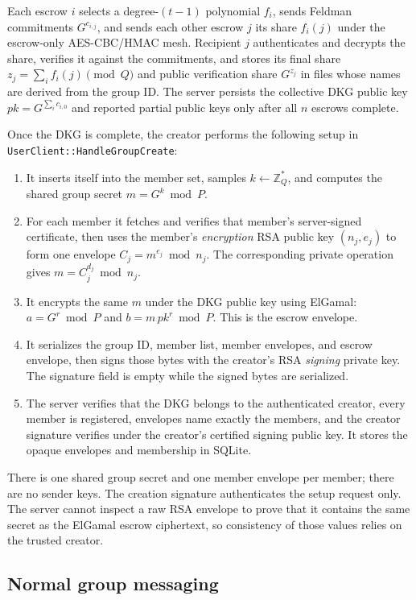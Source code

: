 \documentclass[11pt,a4paper]{article}
\begin{document}
Each escrow $i$ selects a degree-$(t-1)$ polynomial $f_i$, sends Feldman commitments $G^{c_{i,j}}$, and sends each other escrow $j$ its share $f_i(j)$ under the escrow-only AES-CBC/HMAC mesh. Recipient $j$ authenticates and decrypts the share, verifies it against the commitments, and stores its final share $z_j=\sum_i f_i(j)\pmod Q$ and public verification share $G^{z_j}$ in files whose names are derived from the group ID. The server persists the collective DKG public key $pk=G^{\sum_i c_{i,0}}$ and reported partial public keys only after all $n$ escrows complete.

Once the DKG is complete, the creator performs the following setup in \texttt{UserClient::HandleGroupCreate}:

\begin{enumerate}
	\item It inserts itself into the member set, samples $k\leftarrow\mathbb{Z}_Q^*$, and computes the shared group secret $m=G^k\bmod P$.
	\item For each member it fetches and verifies that member's server-signed certificate, then uses the member's \emph{encryption} RSA public key $(n_j,e_j)$ to form one envelope $C_j=m^{e_j}\bmod n_j$. The corresponding private operation gives $m=C_j^{d_j}\bmod n_j$.
	\item It encrypts the same $m$ under the DKG public key using ElGamal: $a=G^r\bmod P$ and $b=m\,pk^r\bmod P$. This is the escrow envelope.
	\item It serializes the group ID, member list, member envelopes, and escrow envelope, then signs those bytes with the creator's RSA \emph{signing} private key. The signature field is empty while the signed bytes are serialized.
	\item The server verifies that the DKG belongs to the authenticated creator, every member is registered, envelopes name exactly the members, and the creator signature verifies under the creator's certified signing public key. It stores the opaque envelopes and membership in SQLite.
\end{enumerate}

There is one shared group secret and one member envelope per member; there are no sender keys. The creation signature authenticates the setup request only. The server cannot inspect a raw RSA envelope to prove that it contains the same secret as the ElGamal escrow ciphertext, so consistency of those values relies on the trusted creator.

\subsection{Normal group messaging}
\end{document}
